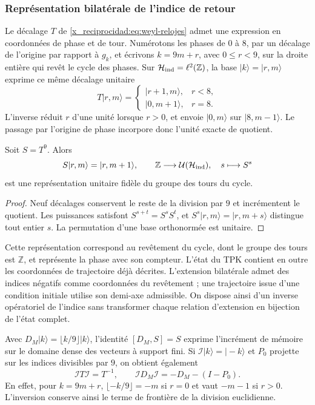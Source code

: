 \subsubsection{Représentation bilatérale de l'indice de retour}

Le décalage \(T\) de \eqref{x_reciprocidad:eq:weyl-relojes} admet une
expression en coordonnées de phase et de tour. Numérotons les phases de \(0\) à
\(8\), par un décalage de l'origine par rapport à \(g_k\), et
écrivons \(k=9m+r\), avec \(0\leq r<9\), sur la droite entière
qui revêt le cycle des phases. Sur
\(\mathcal H_{\rm ind}=\ell^2(\mathbb Z)\), la base
\(|k\rangle=|r,m\rangle\) exprime ce même décalage unitaire
\[
 T|r,m\rangle=
 \begin{cases}
 |r+1,m\rangle,&r<8,\\
 |0,m+1\rangle,&r=8.
 \end{cases}
\]
L'inverse réduit \(r\) d'une unité lorsque \(r>0\), et envoie
\(|0,m\rangle\) sur \(|8,m-1\rangle\). Le passage par l'origine de phase
incorpore donc l'unité exacte de quotient.

\begin{proposition}
\label{x_reciprocidad:mono-ampl:representacion}
Soit \(S=T^9\). Alors
\[
 S|r,m\rangle=|r,m+1\rangle,\qquad
 \mathbb Z\longrightarrow\mathcal U(\mathcal H_{\rm ind}),
 \quad s\longmapsto S^s
\]
est une représentation unitaire fidèle du groupe des tours du cycle.
\end{proposition}
\begin{proof}
Neuf décalages conservent le reste de la division par \(9\) et
incrémentent le quotient. Les puissances satisfont
\(S^{s+t}=S^sS^t\), et \(S^s|r,m\rangle=|r,m+s\rangle\) distingue
tout entier \(s\). La permutation d'une base orthonormée est unitaire.
\end{proof}

Cette représentation correspond au revêtement du cycle, dont le groupe
des tours est \(\mathbb Z\), et représente la phase avec son compteur. L'état
du TPK contient en outre les coordonnées de trajectoire déjà décrites.
L'extension bilatérale admet des indices négatifs comme coordonnées du
revêtement ; une trajectoire issue d'une condition initiale utilise
son demi-axe admissible. On dispose ainsi d'un inverse opératoriel
de l'indice sans transformer chaque relation d'extension en bijection de
l'état complet.

Avec \(D_M|k\rangle=\lfloor k/9\rfloor|k\rangle\), l'identité
\([D_M,S]=S\) exprime l'incrément de mémoire sur le domaine dense des
vecteurs à support fini. Si \(\mathcal I|k\rangle=|-k\rangle\) et
\(P_0\) projette sur les indices divisibles par \(9\), on obtient
également
\begin{equation}
 \mathcal I T\mathcal I=T^{-1},\qquad
 \mathcal I D_M\mathcal I=-D_M-(I-P_0).
 \label{x_reciprocidad:mono-ampl:inversion-contador}
\end{equation}
En effet, pour \(k=9m+r\),
\(\lfloor-k/9\rfloor=-m\) si \(r=0\) et vaut \(-m-1\) si \(r>0\).
L'inversion conserve ainsi le terme de frontière de la division euclidienne.

